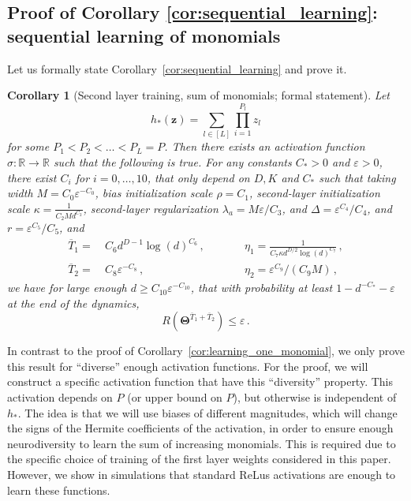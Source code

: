 \documentclass[11pt]{article}
\newcommand{\R}{\mathbb{R}}
\newcommand{\eps}{\varepsilon}
\newcommand{\<}{\langle}
\renewcommand{\>}{\rangle}
\newtheorem{corollary}{Corollary}
\theoremstyle{definition}
\def\bz{{\boldsymbol z}}
\def\bTheta{{\boldsymbol \Theta}}
\def\bz{{\boldsymbol z}}
\def\bTheta{{\boldsymbol \Theta}}
\def\bz{{\boldsymbol z}}
\def\bTheta{{\boldsymbol \Theta}}
\def\eps{\varepsilon}
\def\oT{\overline{T}}
\begin{document}
\subsection{Proof of Corollary \ref{cor:sequential_learning}: sequential learning of monomials}\label{sec:proof_seq_learning}
Let us formally state Corollary~\ref{cor:sequential_learning} and prove it.
\begin{corollary}[Second layer training, sum of monomials; formal statement]\label{cor:sequential_learning_formal}
Let $$h_* (\bz) = \sum_{l \in [L]} \prod_{i=1}^{P_l} z_l$$ for some $P_1 < P_2 < \dots < P_L = P$. Then there exists an activation function $\sigma : \R \to \R$ such that the following is true. For any constants $C_*>0$ and $\eps>0$, there exist $C_i$ for $i= 0, \ldots , 10$, that only depend on $D, K$ and $C_*$ such that taking width $M = C_0 \eps^{-C_0}$,  bias initialization scale $\rho = C_1$, second-layer initialization scale $\kappa = \frac{1}{C_2 M d^{C_2}}$, second-layer regularization $\lambda_a = M\eps / C_3$, and $\Delta = \eps^{C_4} / C_4 $, and $r = \eps^{C_{5}} / C_{5} $, and
\[
\begin{aligned}
\oT_1 =&~ C_6 d^{D-1} \log(d)^{C_6}\, , \qquad &&\eta_1 = \frac{1}{C_7 \kappa d^{D/2}\log(d)^{C_7}}\, , \\
\oT_2 =&~ C_8 \eps^{-C_8} \, , \qquad &&\eta_2 =  \eps^{C_9}/(C_9 M)\, ,
\end{aligned}
\]
we have for large enough $d \geq C_{10}\eps^{-C_{10}}$, that with probability at least $1 - d^{-C_*} - \eps$ at the end of the dynamics,
\[
R ( \bTheta^{\oT_1 + \oT_2} ) \leq \eps \, .
\]
\end{corollary}

In contrast to the proof of Corollary~\ref{cor:learning_one_monomial}, we only prove this result for ``diverse'' enough activation functions. For the proof, we will construct a specific activation function that have this ``diversity'' property. This activation depends on $P$ (or upper bound on $P$), but otherwise is independent of $h_*$. The idea is that we will use biases of different magnitudes, which will change the signs of the Hermite coefficients of the activation, in order to ensure enough neurodiversity to learn the sum of increasing monomials. This is required due to the specific choice of training of the first layer weights considered in this paper. However, we show in simulations that standard ReLus activations are enough to learn these functions.
\end{document}
